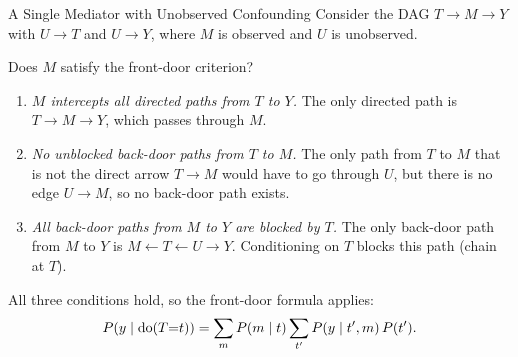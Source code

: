 \documentclass[master.tex]{subfiles}
\begin{document}
\begin{example}{A Single Mediator with Unobserved Confounding}
\label{w3:ex:frontdoorconds}
Consider the DAG $T \to M \to Y$ with $U \to T$ and $U \to Y$, where
$M$ is observed and $U$ is unobserved.

\begin{center}
\end{center}

\noindent Does $M$ satisfy the front-door criterion?
\begin{enumerate}
  \item \emph{$M$ intercepts all directed paths from $T$ to $Y$.}
        The only directed path is $T \to M \to Y$, which passes through
        $M$. \checkmark
  \item \emph{No unblocked back-door paths from $T$ to $M$.}
        The only path from $T$ to $M$ that is not the direct arrow
        $T \to M$ would have to go through $U$, but there is no edge
        $U \to M$, so no back-door path exists. \checkmark
  \item \emph{All back-door paths from $M$ to $Y$ are blocked by $T$.}
        The only back-door path from $M$ to $Y$ is
        $M \leftarrow T \leftarrow U \to Y$.
        Conditioning on $T$ blocks this path (chain at $T$). \checkmark
\end{enumerate}
All three conditions hold, so the front-door formula applies:
\[
  P(y \mid \mathrm{do}(T{=}t))
  = \sum_m P(m \mid t)\sum_{t'} P(y \mid t', m)\,P(t').
\]
\end{example}
\end{document}
